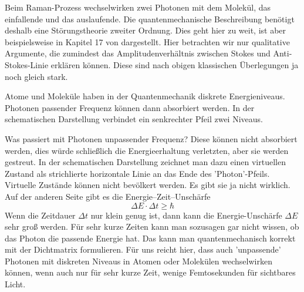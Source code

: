 Beim Raman-Prozess wechselwirken zwei Photonen mit dem Molekül, das einfallende und das auslaufende. Die quantenmechanische Beschreibung benötigt deshalb eine Störungstheorie zweiter Ordnung. Dies geht hier zu weit, ist aber beispielsweise in Kapitel 17 von \cite{Haken_wolf_II} dargestellt. Hier betrachten wir nur qualitative Argumente, die zumindest das Amplitudenverhältnis zwischen Stokes und Anti-Stokes-Linie erklären können. Diese sind nach obigen klassischen Überlegungen ja noch gleich stark.

Atome und Moleküle haben in der Quantenmechanik diskrete Energieniveaus. Photonen passender Frequenz können dann absorbiert werden. In der schematischen Darstellung verbindet ein senkrechter Pfeil zwei Niveaus.

\begin{marginfigure}
\end{marginfigure}
 

Was passiert mit Photonen unpassender Frequenz? Diese können nicht absorbiert werden, dies würde schließlich die Energieerhaltung verletzten, aber sie werden gestreut. In der schematischen Darstellung zeichnet man dazu einen virtuellen Zustand als strichlierte horizontale Linie an das Ende des 'Photon'-Pfeils. Virtuelle Zustände können nicht bevölkert werden. Es gibt sie ja nicht wirklich. Auf der anderen Seite gibt es die Energie--Zeit--Unschärfe
\begin{equation}
\Delta E \cdot \Delta t \ge \hbar
\end{equation}
Wenn die Zeitdauer $\Delta t $ nur klein genug ist, dann kann die Energie-Unschärfe $\Delta E $ sehr groß werden. Für sehr kurze Zeiten kann man sozusagen gar nicht wissen, ob das Photon die passende Energie hat. Das kann man quantenmechanisch korrekt mit der Dichtmatrix formulieren. Für uns reicht hier, dass auch 'unpassende' Photonen mit diskreten Niveaus in Atomen oder Molekülen wechselwirken können, wenn auch nur für sehr kurze Zeit, wenige Femtosekunden für sichtbares Licht.

